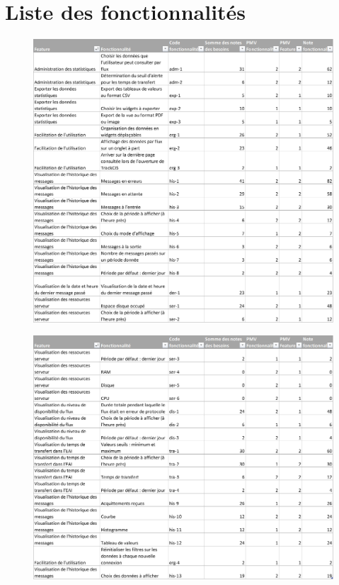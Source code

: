 \tocless\chapter{Liste des fonctionnalités}
	\begin{figure}[H]
		\centering
		\includegraphics[width=17cm]{../img/annexes/fonctios_1.png}
	\end{figure}
	\begin{figure}[H]
		\centering
		\includegraphics[width=17cm]{../img/annexes/fonctios_2.png}
	\end{figure}